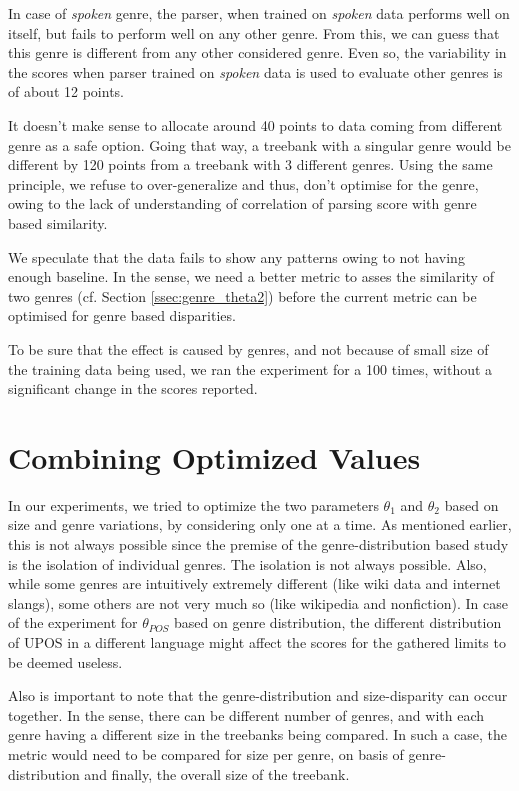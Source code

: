 In case of \textit{spoken} genre, the parser, when trained on \textit{spoken} data performs well on itself, but fails to perform well on any other genre. From this, we can guess that this genre is different from any other considered genre. Even so, the variability in the scores when parser trained on \textit{spoken} data is used to evaluate other genres is of about 12 points.

It doesn't make sense to allocate around 40 points to data coming from different genre as a safe option. Going that way, a treebank with a singular genre would be different by 120 points from a treebank with 3 different genres. Using the same principle, we refuse to over-generalize and thus, don't optimise for the genre, owing to the lack of understanding of correlation of parsing score with genre based similarity.

We speculate that the data fails to show any patterns owing to not having enough baseline. In the sense, we need a better metric to asses the similarity of two genres (cf. Section \ref{ssec:genre_theta2}) before the current metric can be optimised for genre based disparities.

To be sure that the effect is caused by genres, and not because of small size of the training data being used, we ran the experiment for a 100 times, without a significant change in the scores reported.


\section{Combining Optimized Values}

In our experiments, we tried to optimize the two parameters \(\theta_{1}\) and \(\theta_{2}\) based on size and genre variations, by considering only one at a time. As mentioned earlier, this is not always possible since the premise of the genre-distribution based study is the isolation of individual genres. The isolation is not always possible. Also, while some genres are intuitively extremely different (like wiki data and internet slangs), some others are not very much so (like wikipedia and nonfiction). In case of the experiment for \(\theta_{POS}\) based on genre distribution, the different distribution of UPOS in a different language might affect the scores for the gathered limits to be deemed useless.

Also is important to note that the genre-distribution and size-disparity can occur together. In the sense, there can be different number of genres, and with each genre having a different size in the treebanks being compared. In such a case, the metric would need to be compared for size per genre, on basis of genre-distribution and finally, the overall size of the treebank.

